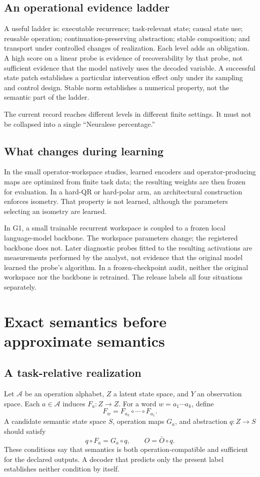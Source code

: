 \documentclass[11pt]{article}
\begin{document}
\subsection{An operational evidence ladder}
A useful ladder is: executable recurrence; task-relevant state; causal state use; reusable operation; continuation-preserving abstraction; stable composition; and transport under controlled changes of realization. Each level adds an obligation. A high score on a linear probe is evidence of recoverability by that probe, not sufficient evidence that the model natively uses the decoded variable. A successful state patch establishes a particular intervention effect only under its sampling and control design. Stable norm establishes a numerical property, not the semantic part of the ladder.

The current record reaches different levels in different finite settings. It must not be collapsed into a single ``Neuralese percentage.''

\subsection{What changes during learning}
In the small operator-workspace studies, learned encoders and operator-producing maps are optimized from finite task data; the resulting weights are then frozen for evaluation. In a hard-QR or hard-polar arm, an architectural construction enforces isometry. That property is not learned, although the parameters selecting an isometry are learned.

In G1, a small trainable recurrent workspace is coupled to a frozen local language-model backbone. The workspace parameters change; the registered backbone does not. Later diagnostic probes fitted to the resulting activations are measurements performed by the analyst, not evidence that the original model learned the probe's algorithm. In a frozen-checkpoint audit, neither the original workspace nor the backbone is retrained. The release labels all four situations separately. \cite{n02,nop,g1,g1d}

\section{Exact semantics before approximate semantics}
\subsection{A task-relative realization}
Let \(\mathcal A\) be an operation alphabet, \(Z\) a latent state space, and \(Y\) an observation space. Each \(a\in\mathcal A\) induces \(F_a:Z\to Z\). For a word \(w=a_1\cdots a_k\), define
\[
 F_w=F_{a_k}\circ\cdots\circ F_{a_1}.
\]
A candidate semantic state space \(S\), operation maps \(G_a\), and abstraction \(q:Z\to S\) should satisfy
\begin{equation}\label{eq:semantics}
 q\circ F_a=G_a\circ q,
 \qquad O=\bar O\circ q.
\end{equation}
These conditions say that semantics is both operation-compatible and sufficient for the declared outputs. A decoder that predicts only the present label establishes neither condition by itself.
\end{document}
